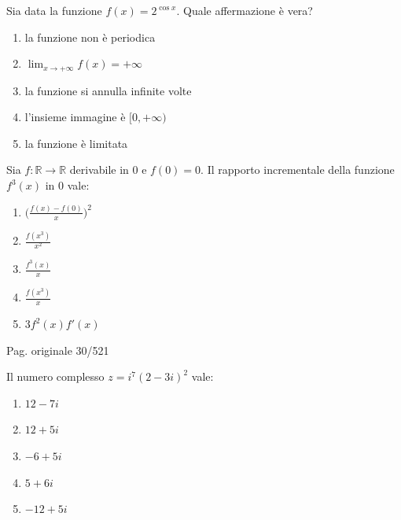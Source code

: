 \begin{quiz}
Sia data la funzione $f(x)=2^{\cos x}$. Quale affermazione \`e vera?
\begin{enumerate}[label=\alph*),leftmargin=1.3cm,itemsep=3pt,topsep=5pt]
\item la funzione non \`e periodica
\item $\lim_{x\to+\infty}f(x)=+\infty$
\item la funzione si annulla infinite volte
\item l'insieme immagine \`e $[0,+\infty)$
\item la funzione \`e limitata
\end{enumerate}
\end{quiz}

\begin{quiz}
Sia $f:\mathbb R\to\mathbb R$ derivabile in $0$ e $f(0)=0$. Il rapporto incrementale della funzione $f^3(x)$ in $0$ vale:
\begin{enumerate}[label=\alph*),leftmargin=1.3cm,itemsep=3pt,topsep=5pt]
\item $\bigl(\frac{f(x)-f(0)}x\bigr)^2$
\item $\frac{f(x^3)}{x^2}$
\item $\frac{f^3(x)}x$
\item $\frac{f(x^3)}x$
\item $3f^2(x)f\prime(x)$
\end{enumerate}
\end{quiz}

\par\noindent\hfill{\color{cyan!65!black}\scriptsize Pag. originale 30/521}\par\smallskip

\begin{quiz}
Il numero complesso $z=i^7(2-3i)^2$ vale:
\begin{enumerate}[label=\alph*),leftmargin=1.3cm,itemsep=3pt,topsep=5pt]
\item $12-7i$
\item $12+5i$
\item $-6+5i$
\item $5+6i$
\item $-12+5i$
\end{enumerate}
\end{quiz}

